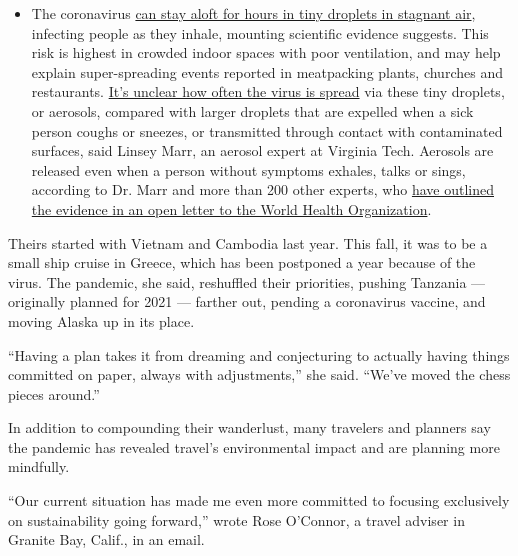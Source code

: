 \begin{itemize}
  \begin{itemize}
  \tightlist
  \item
    The coronavirus
    \href{https://www.nytimes.com/2020/07/04/health/239-experts-with-one-big-claim-the-coronavirus-is-airborne.html?action=click\&pgtype=Article\&state=default\&region=MAIN_CONTENT_3\&context=storylines_faq}{can
    stay aloft for hours in tiny droplets in stagnant air}, infecting
    people as they inhale, mounting scientific evidence suggests. This
    risk is highest in crowded indoor spaces with poor ventilation, and
    may help explain super-spreading events reported in meatpacking
    plants, churches and restaurants.
    \href{https://www.nytimes.com/2020/07/06/health/coronavirus-airborne-aerosols.html?action=click\&pgtype=Article\&state=default\&region=MAIN_CONTENT_3\&context=storylines_faq}{It's
    unclear how often the virus is spread} via these tiny droplets, or
    aerosols, compared with larger droplets that are expelled when a
    sick person coughs or sneezes, or transmitted through contact with
    contaminated surfaces, said Linsey Marr, an aerosol expert at
    Virginia Tech. Aerosols are released even when a person without
    symptoms exhales, talks or sings, according to Dr. Marr and more
    than 200 other experts, who
    \href{https://academic.oup.com/cid/article/doi/10.1093/cid/ciaa939/5867798}{have
    outlined the evidence in an open letter to the World Health
    Organization}.
  \end{itemize}
\end{itemize}

Theirs started with Vietnam and Cambodia last year. This fall, it was to
be a small ship cruise in Greece, which has been postponed a year
because of the virus. The pandemic, she said, reshuffled their
priorities, pushing Tanzania --- originally planned for 2021 --- farther
out, pending a coronavirus vaccine, and moving Alaska up in its place.

``Having a plan takes it from dreaming and conjecturing to actually
having things committed on paper, always with adjustments,'' she said.
``We've moved the chess pieces around.''

In addition to compounding their wanderlust, many travelers and planners
say the pandemic has revealed travel's environmental impact and are
planning more mindfully.

``Our current situation has made me even more committed to focusing
exclusively on sustainability going forward,'' wrote Rose O'Connor, a
travel adviser in Granite Bay, Calif., in an email.

